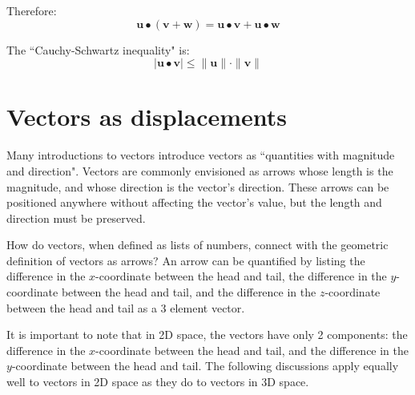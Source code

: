 \documentclass{article}
\begin{document}
Therefore:
\[\mathbf{u} \bullet (\mathbf{v} + \mathbf{w}) = \mathbf{u} \bullet \mathbf{v} + \mathbf{u} \bullet \mathbf{w}\]


The ``Cauchy-Schwartz inequality" is:
\[|\mathbf{u} \bullet \mathbf{v}| \leq \|\mathbf{u}\|\cdot\|\mathbf{v}\|\]





\section*{Vectors as displacements}

Many introductions to vectors introduce vectors as ``quantities with magnitude and direction". Vectors are commonly envisioned as arrows whose length is the magnitude, and whose direction is the vector's direction. These arrows can be positioned anywhere without affecting the vector's value, but the length and direction must be preserved. 

How do vectors, when defined as lists of numbers, connect with the geometric definition of vectors as arrows? An arrow can be quantified by listing the difference in the \(x\)-coordinate between the head and tail, the difference in the \(y\)-coordinate between the head and tail, and the difference in the \(z\)-coordinate between the head and tail as a \(3\) element vector. 

It is important to note that in 2D space, the vectors have only 2 components: the difference in the \(x\)-coordinate between the head and tail, and the difference in the \(y\)-coordinate between the head and tail. The following discussions apply equally well to vectors in 2D space as they do to vectors in 3D space. 
\end{document}

